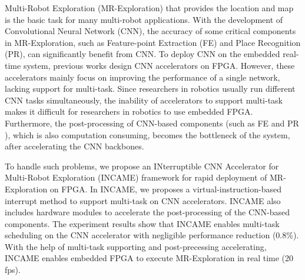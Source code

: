 Multi-Robot Exploration (MR-Exploration) that provides the location and map is the basic task for many multi-robot applications. 
With the development of Convolutional Neural Network (CNN), the accuracy of some critical components in MR-Exploration, such as Feature-point Extraction (FE) and Place Recognition (PR), can significantly benefit from CNN. 
To deploy CNN on the embedded real-time system, previous works design CNN accelerators on FPGA. 
However, these accelerators mainly focus on improving the performance of a single network, lacking support for multi-task. 
Since researchers in robotics usually run different CNN tasks simultaneously, the inability of accelerators to support multi-task makes it difficult for researchers in robotics to use embedded FPGA. 
Furthermore, the post-processing of  CNN-based components (such as FE and PR ), which is also computation consuming, becomes the bottleneck of the system, after accelerating the CNN backbones.

To handle such problems, we propose an INterruptible CNN Accelerator for Multi-Robot Exploration (INCAME) framework for rapid deployment of MR-Exploration on FPGA.
In INCAME, we proposes a virtual-instruction-based interrupt method to support multi-task on CNN accelerators.
INCAME also includes hardware modules to accelerate the post-processing of the CNN-based components.
The experiment results show that INCAME enables multi-task scheduling on the CNN accelerator with negligible performance reduction (0.8\%). With the help of multi-task supporting and post-precessing accelerating, INCAME enables embedded FPGA to execute MR-Exploration in real time (20 fps).

